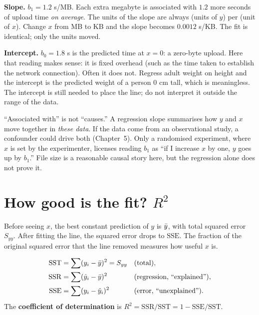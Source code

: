 \textbf{Slope.} $b_1 = 1.2$ s/MB. Each extra megabyte is associated with
$1.2$ more seconds of upload time \emph{on average}. The units of the slope are
always (units of $y$) per (unit of $x$). Change $x$ from MB to KB and the slope
becomes $0.0012$ s/KB. The fit is identical; only the units moved.

\textbf{Intercept.} $b_0 = 1.8$ s is the predicted time at $x=0$: a zero-byte
upload. Here that reading makes sense: it is fixed overhead (such as the time taken to establish the network connection). Often it does not. Regress adult weight on height and the intercept
is the predicted weight of a person 0 cm tall, which is meaningless. The
intercept is still needed to place the line; do not interpret it outside
the range of the data.

\begin{trapbox}
``Associated with'' is not ``causes.'' A regression slope summarises how $y$
and $x$ move together in \emph{these data}. If the data come from an
observational study, a confounder could drive both (Chapter~5). Only a
randomised experiment, where $x$ is set by the experimenter, licenses reading
$b_1$ as ``if I increase $x$ by one, $y$ goes up by $b_1$.'' File size is a
reasonable causal story here, but the regression alone does not prove it.
\end{trapbox}

\section{How good is the fit? \texorpdfstring{$R^2$}{R squared}}
\label{sec:slr-r2}

Before seeing $x$, the best constant prediction of $y$ is $\bar{y}$, with total
squared error $S_{yy}$. After fitting the line, the squared error drops to
$\mathrm{SSE}$. The fraction of the original squared error that the line
removed measures how useful $x$ is.

\begin{definition}
\begin{align*}
  \mathrm{SST} &= \sum (y_i-\bar{y})^2 = S_{yy} && \text{(total)},\\
  \mathrm{SSR} &= \sum (\hat y_i-\bar{y})^2 && \text{(regression, ``explained'')},\\
  \mathrm{SSE} &= \sum (y_i-\hat y_i)^2 && \text{(error, ``unexplained'')}.
\end{align*}
The \textbf{coefficient of determination} is
$R^2 = \mathrm{SSR}/\mathrm{SST} = 1 - \mathrm{SSE}/\mathrm{SST}$.
\end{definition}

